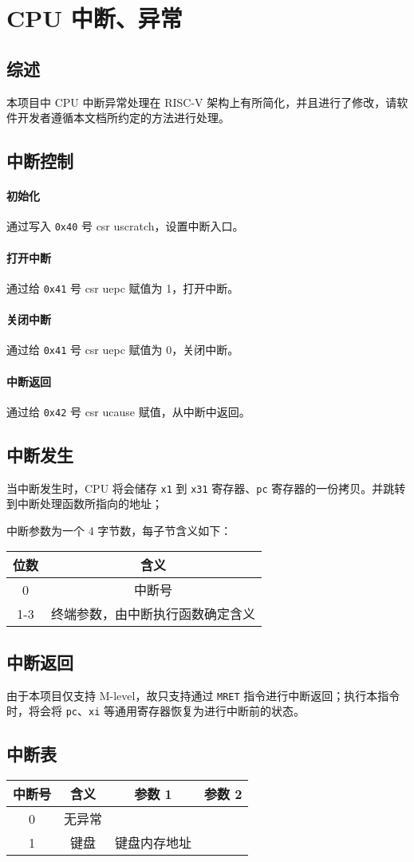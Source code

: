 
\chapter{CPU 中断、异常}

\section{综述}
本项目中 CPU 中断异常处理在 RISC-V 架构上有所简化，并且进行了修改，请软件开发者遵循本文档所约定的方法进行处理。

\section{中断控制}

\subsubsection{初始化}
通过写入 \texttt{0x40} 号 csr uscratch，设置中断入口。

\subsubsection{打开中断}
通过给 \texttt{0x41} 号 csr uepc 赋值为 1，打开中断。

\subsubsection{关闭中断}
通过给 \texttt{0x41} 号 csr uepc 赋值为 0，关闭中断。

\subsubsection{中断返回}
通过给 \texttt{0x42} 号 csr ucause 赋值，从中断中返回。

\section{中断发生}

当中断发生时，CPU 将会储存 \texttt{x1} 到 \texttt{x31} 寄存器、\texttt{pc} 寄存器的一份拷贝。并跳转到中断处理函数所指向的地址；

中断参数为一个 4 字节数，每子节含义如下：
\begin{tabular}{|c|c|}
    \hline
    位数 & 含义 \\\hline
    0     & 中断号 \\\hline
    1-3     & 终端参数，由中断执行函数确定含义 \\\hline
\end{tabular}

\section{中断返回}

由于本项目仅支持 M-level，故只支持通过 \texttt{MRET} 指令进行中断返回；执行本指令时，将会将 \texttt{pc}、\texttt{xi} 等通用寄存器恢复为进行中断前的状态。

\section{中断表}
\begin{tabular}{|c|c|c|c|}
    \hline
    中断号 & 含义 & 参数 1 & 参数 2\\\hline
    0     & 无异常 & &\\\hline
    1     & 键盘 & 键盘内存地址 &\\\hline
\end{tabular}